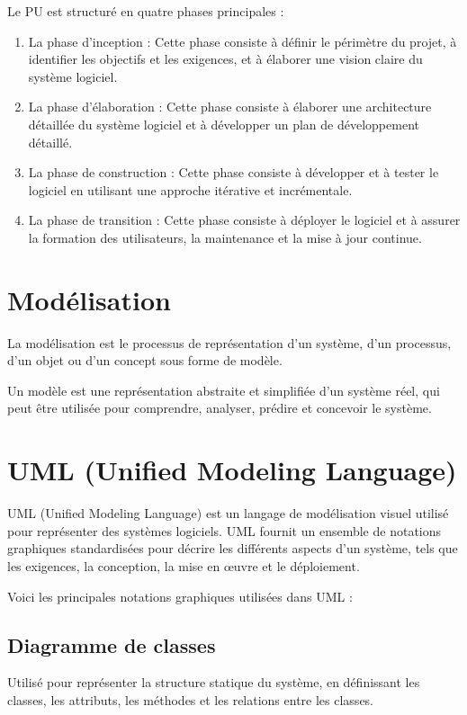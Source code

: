 Le PU est structuré en quatre phases principales :
\begin{enumerate}
    \item La phase d'inception : Cette phase consiste à définir le périmètre du projet, à identifier les objectifs et les exigences, et à élaborer une vision claire du système logiciel.
    \item La phase d'élaboration : Cette phase consiste à élaborer une architecture détaillée du système logiciel et à développer un plan de développement détaillé.
    \item La phase de construction : Cette phase consiste à développer et à tester le logiciel en utilisant une approche itérative et incrémentale.
    \item La phase de transition : Cette phase consiste à déployer le logiciel et à assurer la formation des utilisateurs, la maintenance et la mise à jour continue.
\end{enumerate}

\section{Modélisation}\label{subsec:modelisation}
La modélisation est le processus de représentation d'un système, d'un processus, d'un objet ou d'un concept sous forme de modèle. 

Un modèle est une représentation abstraite et simplifiée d'un système réel, qui peut être utilisée pour comprendre, analyser, prédire et concevoir le système.

\section{UML (Unified Modeling Language)}\label{subsec:uml}
UML (Unified Modeling Language) est un langage de modélisation visuel utilisé pour représenter des systèmes logiciels. UML fournit un ensemble de notations graphiques standardisées pour décrire les différents aspects d'un système, tels que les exigences, la conception, la mise en œuvre et le déploiement.

Voici les principales notations graphiques utilisées dans UML :
\subsection{Diagramme de classes}\label{subsec:diagrammes-de-classe}
 Utilisé pour représenter la structure statique du système, en définissant les classes, les attributs, les méthodes et les relations entre les classes.
